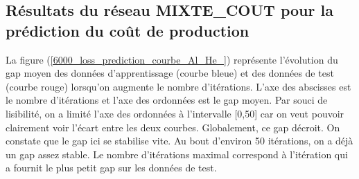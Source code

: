 





\subsection{Résultats du réseau \textbf{MIXTE\_COUT} pour la prédiction du coût de production}

La figure (\ref{6000_loss_prediction_courbe_Al_He_}) représente l'évolution du gap moyen des données d'apprentissage (courbe bleue) et des données de test (courbe rouge) lorsqu'on augmente le nombre d'itérations. L'axe des abscisses est le nombre d'itérations et l'axe des ordonnées est le gap moyen. Par souci de lisibilité, on a limité l'axe des ordonnées à l'intervalle [0,50] car on veut pouvoir clairement voir l'écart entre les deux courbes. Globalement, ce gap décroit. On constate que le gap ici se stabilise vite. Au bout d'environ 50 itérations, on a déjà un gap assez stable. Le nombre d'itérations maximal correspond à l'itération qui a fournit le plus petit gap sur les données de test.


